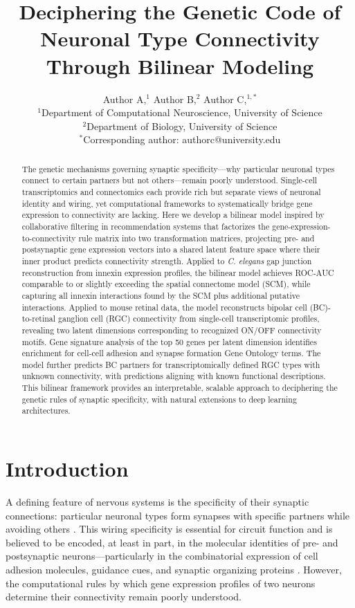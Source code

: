 \documentclass[11pt]{article}
\title{Deciphering the Genetic Code of Neuronal Type Connectivity Through Bilinear Modeling}
\author{Author A,$^{1}$ Author B,$^{2}$ Author C,$^{1,*}$\\
\small $^{1}$Department of Computational Neuroscience, University of Science\\
\small $^{2}$Department of Biology, University of Science\\
\small $^{*}$Corresponding author: authorc@university.edu}
\date{}
\begin{document}
\maketitle

\begin{abstract}
The genetic mechanisms governing synaptic specificity---why particular neuronal types connect to certain partners but not others---remain poorly understood. Single-cell transcriptomics and connectomics each provide rich but separate views of neuronal identity and wiring, yet computational frameworks to systematically bridge gene expression to connectivity are lacking. Here we develop a bilinear model inspired by collaborative filtering in recommendation systems that factorizes the gene-expression-to-connectivity rule matrix into two transformation matrices, projecting pre- and postsynaptic gene expression vectors into a shared latent feature space where their inner product predicts connectivity strength. Applied to \textit{C. elegans} gap junction reconstruction from innexin expression profiles, the bilinear model achieves ROC-AUC comparable to or slightly exceeding the spatial connectome model (SCM), while capturing all innexin interactions found by the SCM plus additional putative interactions. Applied to mouse retinal data, the model reconstructs bipolar cell (BC)-to-retinal ganglion cell (RGC) connectivity from single-cell transcriptomic profiles, revealing two latent dimensions corresponding to recognized ON/OFF connectivity motifs. Gene signature analysis of the top 50 genes per latent dimension identifies enrichment for cell-cell adhesion and synapse formation Gene Ontology terms. The model further predicts BC partners for transcriptomically defined RGC types with unknown connectivity, with predictions aligning with known functional descriptions. This bilinear framework provides an interpretable, scalable approach to deciphering the genetic rules of synaptic specificity, with natural extensions to deep learning architectures.
\end{abstract}

\section{Introduction}

A defining feature of nervous systems is the specificity of their synaptic connections: particular neuronal types form synapses with specific partners while avoiding others \citep{sanes2015synaptic, sudhof2018towards}. This wiring specificity is essential for circuit function and is believed to be encoded, at least in part, in the molecular identities of pre- and postsynaptic neurons---particularly in the combinatorial expression of cell adhesion molecules, guidance cues, and synaptic organizing proteins \citep{washbourne2004cell}. However, the computational rules by which gene expression profiles of two neurons determine their connectivity remain poorly understood.
\end{document}
